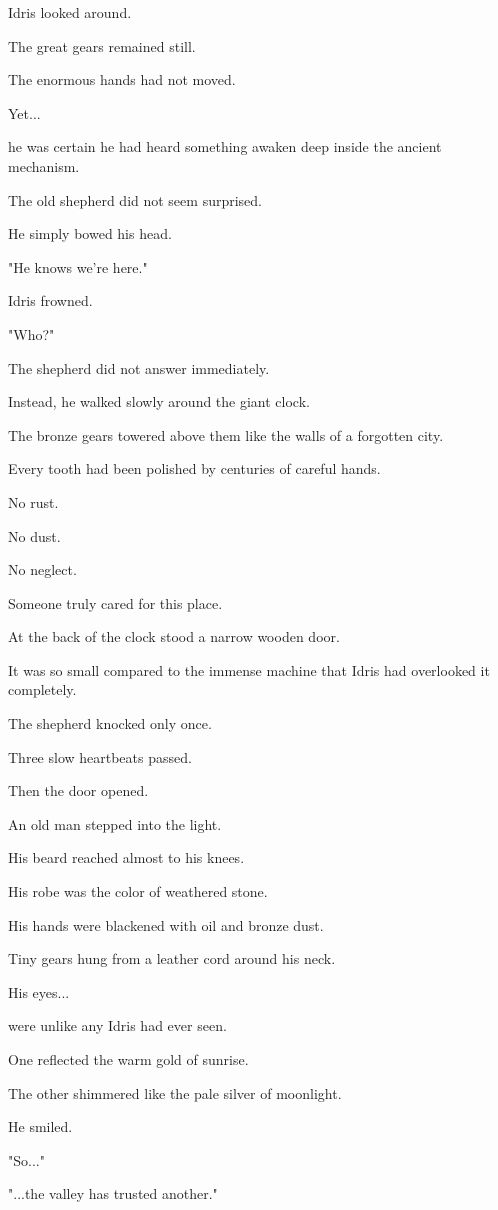 \documentclass[12pt,openany]{book}
\begin{document}
Idris looked around.

The great gears remained still.

The enormous hands had not moved.

Yet...

he was certain he had heard something awaken deep inside the ancient mechanism.

The old shepherd did not seem surprised.

He simply bowed his head.

"He knows we're here."

Idris frowned.

"Who?"

The shepherd did not answer immediately.

Instead, he walked slowly around the giant clock.

The bronze gears towered above them like the walls of a forgotten city.

Every tooth had been polished by centuries of careful hands.

No rust.

No dust.

No neglect.

Someone truly cared for this place.

At the back of the clock stood a narrow wooden door.

It was so small compared to the immense machine that Idris had overlooked it completely.

The shepherd knocked only once.

Three slow heartbeats passed.

Then the door opened.

An old man stepped into the light.

His beard reached almost to his knees.

His robe was the color of weathered stone.

His hands were blackened with oil and bronze dust.

Tiny gears hung from a leather cord around his neck.

His eyes...

were unlike any Idris had ever seen.

One reflected the warm gold of sunrise.

The other shimmered like the pale silver of moonlight.

He smiled.

"So..."

"...the valley has trusted another."
\end{document}
